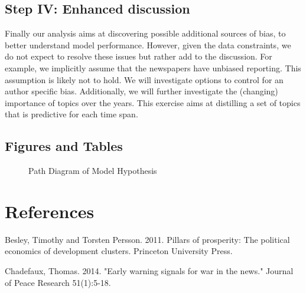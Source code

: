 \subsection{Step IV: Enhanced discussion}
Finally our analysis aims at discovering possible additional sources of bias, to better understand model performance. However, given the data constraints, we do not expect to resolve these issues but rather add to the discussion. 
For example, we implicitly assume that the newspapers have unbiased reporting. This assumption is likely not to hold. We will investigate options to control for an author specific bias. 
Additionally, we will further investigate the (changing) importance of topics over the years. This exercise aims at distilling a set of topics that is predictive for each time span.

\newpage

\begin{appendix}
    \section{Figures and Tables}
     


    \begin{figure}[!htbp]
        \caption{Path Diagram of Model Hypothesis}
        \centering
        
        \label{path}
    \end{figure}
\end{appendix}

\newpage

\section*{References}
Besley, Timothy and Torsten Persson. 2011. Pillars of prosperity: The political economics \newline \indent of development clusters. Princeton University Press.\vspace{0.25cm}

\noindent Chadefaux, Thomas. 2014. "Early warning signals for war in the news." Journal of Peace \newline \indent Research 51(1):5-18.\vspace{0.25cm}

